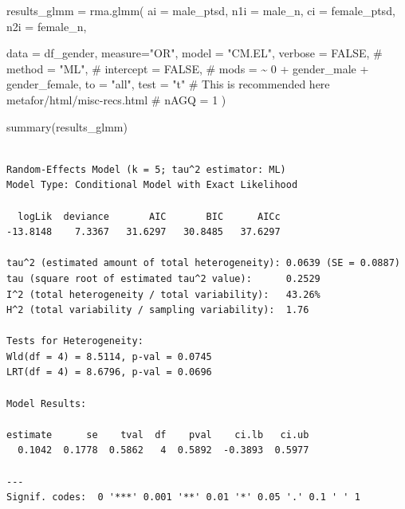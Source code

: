 \documentclass[
  letterpaper,
  DIV=11,
  numbers=noendperiod]{scrartcl}
\newenvironment{Shaded}{\begin{snugshade}}{\end{snugshade}}
\newcommand{\AttributeTok}[1]{\textcolor[rgb]{0.40,0.45,0.13}{#1}}
\newcommand{\CommentTok}[1]{\textcolor[rgb]{0.37,0.37,0.37}{#1}}
\newcommand{\ConstantTok}[1]{\textcolor[rgb]{0.56,0.35,0.01}{#1}}
\newcommand{\FunctionTok}[1]{\textcolor[rgb]{0.28,0.35,0.67}{#1}}
\newcommand{\NormalTok}[1]{\textcolor[rgb]{0.00,0.23,0.31}{#1}}
\newcommand{\OtherTok}[1]{\textcolor[rgb]{0.00,0.23,0.31}{#1}}
\newcommand{\StringTok}[1]{\textcolor[rgb]{0.13,0.47,0.30}{#1}}
\begin{document}
\begin{Shaded}
\begin{Highlighting}[]
\NormalTok{results\_glmm }\OtherTok{=} \FunctionTok{rma.glmm}\NormalTok{(}
  \AttributeTok{ai =} \StringTok{\textasciigrave{}}\AttributeTok{male\_ptsd}\StringTok{\textasciigrave{}}\NormalTok{, }
  \AttributeTok{n1i =} \StringTok{\textasciigrave{}}\AttributeTok{male\_n}\StringTok{\textasciigrave{}}\NormalTok{,}
  \AttributeTok{ci =} \StringTok{\textasciigrave{}}\AttributeTok{female\_ptsd}\StringTok{\textasciigrave{}}\NormalTok{,}
  \AttributeTok{n2i =} \StringTok{\textasciigrave{}}\AttributeTok{female\_n}\StringTok{\textasciigrave{}}\NormalTok{,}
  
  \AttributeTok{data =}\NormalTok{ df\_gender, }
  \AttributeTok{measure=}\StringTok{"OR"}\NormalTok{,}
  \AttributeTok{model =} \StringTok{"CM.EL"}\NormalTok{,}
  \AttributeTok{verbose =} \ConstantTok{FALSE}\NormalTok{,}
  \CommentTok{\# method = "ML",}
  \CommentTok{\# intercept = FALSE,}
  \CommentTok{\# mods = \textasciitilde{} 0 + gender\_male + gender\_female,}
  \AttributeTok{to =} \StringTok{"all"}\NormalTok{,}
  \AttributeTok{test =} \StringTok{"t"} \CommentTok{\# This is recommended here metafor/html/misc{-}recs.html}
  \CommentTok{\# nAGQ = 1}
\NormalTok{)}


\FunctionTok{summary}\NormalTok{(results\_glmm)}
\end{Highlighting}
\end{Shaded}

\begin{verbatim}

Random-Effects Model (k = 5; tau^2 estimator: ML)
Model Type: Conditional Model with Exact Likelihood

  logLik  deviance       AIC       BIC      AICc   
-13.8148    7.3367   31.6297   30.8485   37.6297   

tau^2 (estimated amount of total heterogeneity): 0.0639 (SE = 0.0887)
tau (square root of estimated tau^2 value):      0.2529
I^2 (total heterogeneity / total variability):   43.26%
H^2 (total variability / sampling variability):  1.76

Tests for Heterogeneity:
Wld(df = 4) = 8.5114, p-val = 0.0745
LRT(df = 4) = 8.6796, p-val = 0.0696

Model Results:

estimate      se    tval  df    pval    ci.lb   ci.ub    
  0.1042  0.1778  0.5862   4  0.5892  -0.3893  0.5977    

---
Signif. codes:  0 '***' 0.001 '**' 0.01 '*' 0.05 '.' 0.1 ' ' 1
\end{verbatim}
\end{document}
